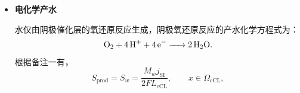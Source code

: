 \documentclass[bwprint]{gmcmthesis}
\numberwithin{equation}{section}
\numberwithin{figure}{section}
\begin{document}
\begin{itemize}
 设 \(J_v\) 和 \(J_l\) 分别表示水蒸气和液态水沿 \(x\) 方向的质量通量。由于冰被视为静止固相，其宏观质量通量满足 \(J_i = 0\)。

 分别记冷凝、蒸发、冻结、融化、凝华和升华速率为
\[
r_{\text{cond}}, \quad r_{\text{evap}}, \quad r_{\text{frz}}, \quad r_{\text{mlt}}, \quad r_{\text{dep}}, \quad r_{\text{sub}},
\]
单位均为 \(\text{kg m}^{-3}\text{s}^{-1}\)。同时记 \(S_{\text{prod}}\) 为阴极电化学反应产生水的体积源项。

 对三相分别建立质量守恒方程。水蒸气满足
\begin{equation}
\frac{\partial m_v}{\partial t} = -\frac{\partial J_v}{\partial x} - r_{\text{cond}} + r_{\text{evap}} - r_{\text{dep}} + r_{\text{sub}}. \label{eq:src:4-17}
\end{equation}

 液态水满足
\begin{equation}
\frac{\partial m_l}{\partial t} = -\frac{\partial J_l}{\partial x} + r_{\text{cond}} - r_{\text{evap}} - r_{\text{frz}} + r_{\text{mlt}} + S_{\text{prod}}. \label{eq:src:4-18}
\end{equation}

 固态冰不发生宏观迁移，其质量变化完全来自相变：
\begin{equation}
\frac{\partial m_i}{\partial t} = r_{\text{frz}} - r_{\text{mlt}} + r_{\text{dep}} - r_{\text{sub}}. \label{eq:src:4-19}
\end{equation}

将\eqref{eq:src:4-17}--\eqref{eq:src:4-19}相加，六个内部相变项相互抵消。

令$N_w=J_v+J_l$、$S_w=S_{\mathrm{prod}}$，结合\eqref{eq:src:4-11}即有
\begin{equation}
\frac{\partial m_w}{\partial t} = -\frac{\partial N_w}{\partial x} + S_w. \label{eq:src:4-21}
\end{equation}

 可见，所建立的三相模型与题目常温模型中的总水守恒方程严格相容，相变只改变水在气、液、固三相之间的分配，并不改变水的总质量。


\item \textbf {电化学产水}

 水仅由阴极催化层的氧还原反应生成，阴极氧还原反应的产水化学方程式为：
\begin{equation}
\ce{O2 + 4H+ + 4e- -> 2H2O}. \label{eq:src:4-22}
\end{equation}
根据备注一有，
\begin{equation}
S_{\text{prod}} = S_w = \frac{M_w j_{\mathrm{SI}}}{2F L_{\text{cCL}}}, \qquad x \in \Omega_{\text{cCL}}, \label{eq:src:4-23}
\end{equation}


\end{itemize}
\end{document}
